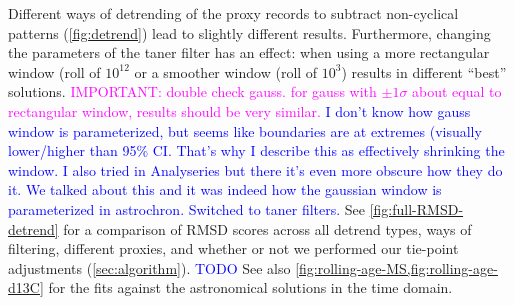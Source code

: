\documentclass[draft]{agujournal2019}
\newcommand{\rez}{\textcolor{magenta}}
\newcommand{\ijk}{\textcolor{blue}}
\begin{document}


Different ways of detrending of the proxy records to subtract non-cyclical patterns (\cref{fig:detrend}) lead to slightly different results.
Furthermore, changing the parameters of the taner filter has an effect: when using a more rectangular window (roll of \(10^{12}\) or a smoother window (roll of \(10^{3}\)) results in different ``best'' solutions.
\rez{IMPORTANT: double check gauss. for gauss with $\pm 1 \sigma$ about equal to rectangular window, results should be very similar.}
\ijk{I don't know how gauss window is parameterized, but seems like boundaries are at extremes (visually lower/higher than 95\% CI. That's why I describe this as effectively shrinking the window. I also tried in Analyseries but there it's even more obscure how they do it.}
\ijk{We talked about this and it was indeed how the gaussian window is parameterized in astrochron. Switched to taner filters.}
See \cref{fig:full-RMSD-detrend} for a comparison of \gls{RMSD} scores across all detrend types, ways of filtering, different proxies, and whether or not we performed our tie-point adjustments (\cref{sec:algorithm}). \ijk{TODO}
See also \cref{fig:rolling-age-MS,fig:rolling-age-d13C} for the fits against the astronomical solutions in the time domain.




\end{document}

